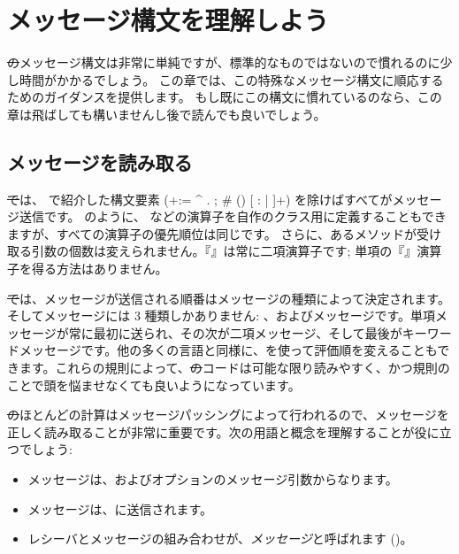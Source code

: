 \documentclass[a4paper,10pt,twoside]{book}
\begin{document}
	\renewcommand{\nnbb}[2]{} %
	\sloppy
\fi
\chapter{メッセージ構文を理解しよう}

\st のメッセージ構文は非常に単純ですが、標準的なものではないので慣れるのに少し時間がかかるでしょう。
この章では、この特殊なメッセージ構文に順応するためのガイダンスを提供します。
もし既にこの構文に慣れているのなら、この章は飛ばしても構いませんし後で読んでも良いでしょう。

\section{メッセージを読み取る}

\st では、 で紹介した構文要素 (\ct+:= ^ . ; # () {} [ : | ]+) を除けばすべてがメッセージ送信です。
 のように、\ct{+} などの演算子を自作のクラス用に定義することもできますが、すべての演算子の優先順位は同じです。
さらに、あるメソッドが受け取る引数の個数は変えられません。『\ct{-}』は常に二項演算子です; 単項の『\ct{-}』演算子を得る方法はありません。

\st では、メッセージが送信される順番はメッセージの種類によって決定されます。そしてメッセージには 3 種類しかありません: 、およびメッセージです。単項メッセージが常に最初に送られ、その次が二項メッセージ、そして最後がキーワードメッセージです。他の多くの言語と同様に、を使って評価順を変えることもできます。これらの規則によって、\st のコードは可能な限り読みやすく、かつ規則のことで頭を悩ませなくても良いようになっています。

\st のほとんどの計算はメッセージパッシングによって行われるので、メッセージを正しく読み取ることが非常に重要です。次の用語と概念を理解することが役に立つでしょう:

\begin{itemize}
  \item メッセージは、およびオプションのメッセージ引数からなります。
  \item メッセージは、に送信されます。
  \item レシーバとメッセージの組み合わせが、\emph{メッセージ}と呼ばれます ()。
\end{itemize}
\end{document}

